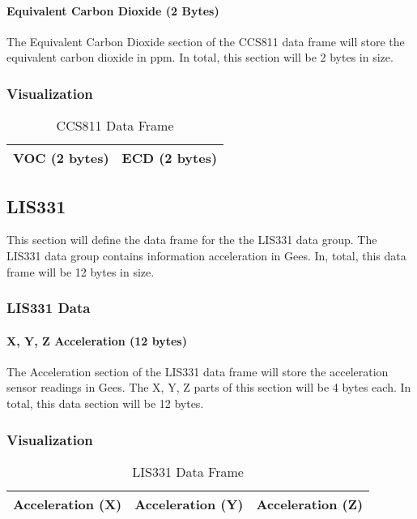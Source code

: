 \documentclass{article}
\begin{document}
  \paragraph{Equivalent Carbon Dioxide (2 Bytes)}
  The Equivalent Carbon Dioxide section of the CCS811 data frame will store the equivalent carbon dioxide in ppm. In total, this section will be 2 bytes in size.
  \subsubsection{Visualization}
  
  \begin{table}[H]
  \centering
  \caption{CCS811 Data Frame}
  \label{my-label}
  \begin{tabular}{|l|l|}
  \hline
VOC (2 bytes) & ECD (2 bytes) \\ \hline 
  \end{tabular}
  \end{table}
 
  \pagebreak
 
 \subsection{LIS331}
 This section will define the data frame for the the LIS331 data group. The LIS331 data group contains information acceleration in Gees. In,  total, this data frame will be 12 bytes in size.
 \subsubsection{LIS331 Data}
 \paragraph{X, Y, Z Acceleration (12 bytes)}
 The Acceleration section of the LIS331 data frame will store the acceleration sensor readings in Gees. The X, Y, Z parts of this section will be 4 bytes each. In total, this data section will be 12 bytes.
 \subsubsection{Visualization}
 
 \begin{table}[H]
 \centering
 \caption{LIS331 Data Frame}
 \label{my-label}
 \begin{tabular}{|l|l|l|}
 \hline
Acceleration (X) & Acceleration (Y) & Acceleration (Z) \\ \hline
 \end{tabular}
 \end{table}
 
\end{document}
